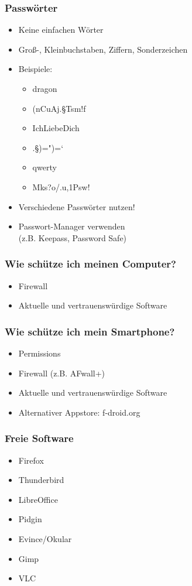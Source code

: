 \documentclass[12pt]{beamer}
\begin{document}
\begin{frame}
    \frametitle{Passwörter}
    \begin{itemize}
        \item<2-> Keine einfachen Wörter
        \item<3-> Groß-, Kleinbuchstaben, Ziffern, Sonderzeichen
        \item<4-> Beispiele:
            \begin{itemize}
                \item<5-> dragon
                \item<6-> (nCuAj.§Tsm!f
                \item<7-> IchLiebeDich
                \item<8-> .§)=")=`
                \item<10-> qwerty
                \item<11-> Mks?o/.u,1Psw!
            \end{itemize}
        \item<12-> Verschiedene Passwörter nutzen!
        \item<13-> Passwort-Manager verwenden \\ (z.B. Keepass, Password Safe)
    \end{itemize}
\end{frame}

\begin{frame}
    \frametitle{Wie schütze ich meinen Computer?}
    \begin{itemize}
      \item Firewall
      \item Aktuelle und vertrauenswürdige Software
    \end{itemize}
\end{frame}

\begin{frame}
    \frametitle{Wie schütze ich mein Smartphone?}
    \begin{itemize}
      \item Permissions
      \item Firewall (z.B. AFwall+)
      \item Aktuelle und vertrauenswürdige Software
      \item Alternativer Appstore: f-droid.org
    \end{itemize}
\end{frame}

\begin{frame}
    \frametitle{Freie Software}
    \begin{itemize}
      \item Firefox
      \item Thunderbird
      \item LibreOffice
      \item Pidgin
      \item Evince/Okular
      \item Gimp
      \item VLC
    \end{itemize}
\end{frame}
\end{document}
